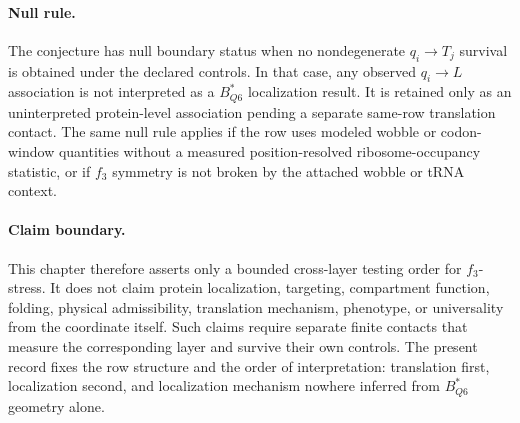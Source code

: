 \paragraph{Null rule.}
The conjecture has null boundary status when no nondegenerate $q_i \to T_j$ survival is obtained under the declared controls.  In that case, any observed $q_i \to L$ association is not interpreted as a $B^*_{Q6}$ localization result.  It is retained only as an uninterpreted protein-level association pending a separate same-row translation contact.  The same null rule applies if the row uses modeled wobble or codon-window quantities without a measured position-resolved ribosome-occupancy statistic, or if $f_3$ symmetry is not broken by the attached wobble or tRNA context.

\paragraph{Claim boundary.}
This chapter therefore asserts only a bounded cross-layer testing order for $f_3$-stress.  It does not claim protein localization, targeting, compartment function, folding, physical admissibility, translation mechanism, phenotype, or universality from the coordinate itself.  Such claims require separate finite contacts that measure the corresponding layer and survive their own controls.  The present record fixes the row structure and the order of interpretation: translation first, localization second, and localization mechanism nowhere inferred from $B^*_{Q6}$ geometry alone.
